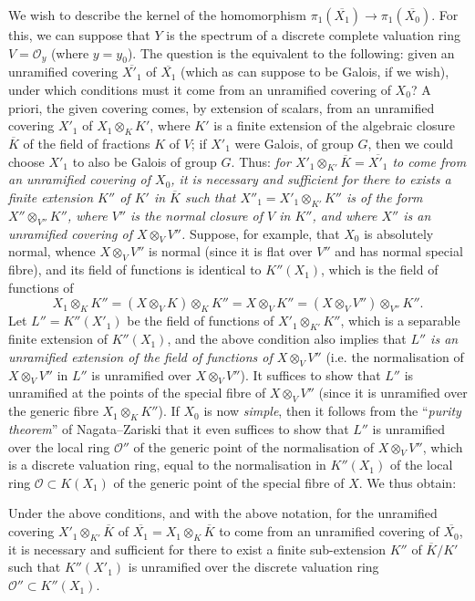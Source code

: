 \documentclass{article}
\theoremstyle{plain}
\newenvironment{corollary}[1]
  {\renewcommand\theinnercustomcorollary{#1}\innercustomcorollary}
  {\endinnercustomcorollary}
\theoremstyle{definition}
\newcommand{\sh}{\mathscr}
\newcommand{\oldpage}[1]{\marginpar{\footnotesize$\Big\vert$ \textit{p.~#1}}}
\begin{document}
We wish to describe the kernel of the homomorphism $\pi_1(\overline{X_1})\to\pi_1(\overline{X_0})$.
For this, we can suppose that $Y$ is the spectrum of a discrete complete valuation ring $V=\sh{O}_y$ (where $y=y_0$).
The question is the equivalent to the following:
given an unramified covering $\overline{X'_1}$ of $\overline{X_1}$ (which as can suppose to be Galois, if we wish), under which conditions must it come from an unramified covering of $X_0$?
A priori, the given covering comes, by extension of scalars, from an unramified covering $X'_1$ of $X_1\otimes_KK'$, where $K'$ is a finite extension of the algebraic closure $\overline{K}$ of the field of fractions $K$ of $V$;
if $X'_1$ were Galois, of group $G$, then we could choose $X'_1$ to also be Galois of group $G$.
Thus: \emph{for $X'_1\otimes_{K'}\overline{K}=\overline{X'_1}$ to come from an unramified covering of $X_0$, it is necessary and sufficient for there to exists a finite extension $K''$ of $K'$ in $\overline{K}$ such that $X''_1=X'_1\otimes_{K'}K''$ is of the form $X''\otimes_{V''}K''$, where $V''$ is the normal closure of $V$ in $K''$, and where $X''$ is an unramified covering of $X\otimes_V V''$.}
Suppose, for example, that $X_0$ is absolutely normal, whence $X\otimes_V V''$ is normal (since it is flat over $V''$ and has normal special fibre), and its field of functions is identical to $K''(X_1)$, which is the field of functions of
\[
  X_1\otimes_K K'' = (X\otimes_VK)\otimes_KK'' = X\otimes_VK'' = (X\otimes_VV'')\otimes_{V''}K''.
\]
\oldpage{182-26}
Let $L''=K''(X'_1)$ be the field of functions of $X'_1\otimes_{K'}K''$, which is a separable finite extension of $K''(X_1)$, and the above condition also implies that \emph{$L''$ is an unramified extension of the field of functions of $X\otimes_VV''$} (i.e. the normalisation of $X\otimes_V V''$ in $L''$ is unramified over $X\otimes_VV''$).
It suffices to show that $L''$ is unramified at the points of the special fibre of $X\otimes_VV''$ (since it is unramified over the generic fibre $X_1\otimes_KK''$).
If $X_0$ is now \emph{simple}, then it follows from the ``\emph{purity theorem}'' of Nagata--Zariski that it even suffices to show that $L''$ is unramified over the local ring $\sh{O}''$ of the generic point of the normalisation of $X\otimes_VV''$, which is a discrete valuation ring, equal to the normalisation in $K''(X_1)$ of the local ring $\sh{O}\subset K(X_1)$ of the generic point of the special fibre of $X$.
We thus obtain:

\begin{corollary}{5}
\label{theorem12corollary5}
  Under the above conditions, and with the above notation, for the unramified covering $X'_1\otimes_{K'}\overline{K}$ of $\overline{X_1}=X_1\otimes_K\overline{K}$ to come from an unramified covering of $\overline{X_0}$, it is necessary and sufficient for there to exist a finite sub-extension $K''$ of $\overline{K}/K'$ such that $K''(X'_1)$ is unramified over the discrete valuation ring $\sh{O}''\subset K''(X_1)$.
\end{corollary}
\end{document}
